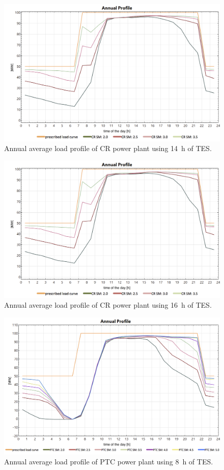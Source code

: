 %
\begin{figure}[htbp]  
\centering
\includegraphics[width=0.8\linewidth]{FIG/Appendix_LCC/CR14h}
\caption[Annual average load profile of CR power plant using 14~h of TES.]{Annual average load profile of CR power plant using 14~h of TES.}\label{CR14h}
\end{figure}
%
\begin{figure}[htbp]  
\centering
\includegraphics[width=0.8\linewidth]{FIG/Appendix_LCC/CR16h}
\caption[Annual average load profile of CR power plant using 16~h of TES.]{Annual average load profile of CR power plant using 16~h of TES.}\label{CR16h}
\end{figure}
%
\begin{figure}[htbp]  
\centering
\includegraphics[width=0.8\linewidth]{FIG/Appendix_LCC/PTC8h}
\caption[Annual average load profile of PTC power plant using 8~h of TES.]{Annual average load profile of PTC power plant using 8~h of TES.}\label{PTC8h}
\end{figure}
